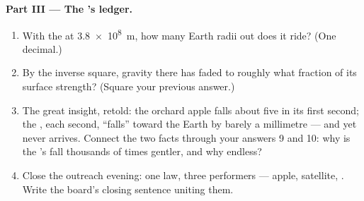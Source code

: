 \begin{problem}
\medskip\noindent\textbf{Part III --- The 's ledger.}
\begin{enumerate}[resume]
  \item With the  at \qty{3.8e8}{m}, how many Earth
        radii out does it ride? (One decimal.)
  \item By the inverse square, gravity there has faded to
        roughly what fraction of its surface strength?
        (Square your previous answer.)
  \item The great insight, retold: the orchard apple falls
        about five  in its first second; the ,
        each second, ``falls'' toward the Earth by barely a
        millimetre --- and yet never arrives. Connect the two
        facts through your answers 9 and 10: why is the
        's fall thousands of times gentler, and why
        endless?
  \item Close the outreach evening: one law, three
        performers --- apple, satellite, . Write the
        board's closing sentence uniting them.
\end{enumerate}
\end{problem}
